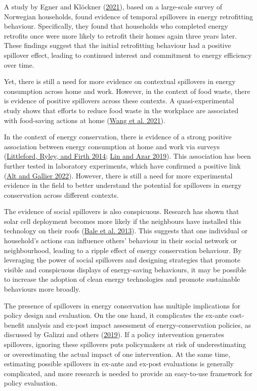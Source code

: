 \documentclass[
  11pt,
  captions=heading]{scrreport}
\begin{document}
A study by Egner and Klöckner
(\protect\hyperlink{ref-egner2021temporal}{2021}), based on a
large-scale survey of Norwegian households, found evidence of temporal
spillovers in energy retrofitting behaviour. Specifically, they found
that households who completed energy retrofits once were more likely to
retrofit their homes again three years later. These findings suggest
that the initial retrofitting behaviour had a positive spillover effect,
leading to continued interest and commitment to energy efficiency over
time.

Yet, there is still a need for more evidence on contextual spillovers in
energy consumption across home and work. However, in the context of food
waste, there is evidence of positive spillovers across these contexts. A
quasi-experimental study shows that efforts to reduce food waste in the
workplace are associated with food-saving actions at home
(\protect\hyperlink{ref-wang2021take}{Wang et al. 2021}).

In the context of energy conservation, there is evidence of a strong
positive association between energy consumption at home and work via
surveys (\protect\hyperlink{ref-littleford2014context}{Littleford,
Ryley, and Firth 2014}; \protect\hyperlink{ref-lin2019mixing}{Lin and
Azar 2019}). This association has been further tested in laboratory
experiments, which have confirmed a positive link
(\protect\hyperlink{ref-alt2022incentives}{Alt and Gallier 2022}).
However, there is still a need for more experimental evidence in the
field to better understand the potential for spillovers in energy
conservation across different contexts.

The evidence of social spillovers is also conspicuous. Research has
shown that solar cell deployment becomes more likely if the neighbours
have installed this technology on their roofs
(\protect\hyperlink{ref-bale2013harnessing}{Bale et al. 2013}). This
suggests that one individual or household's actions can influence
others' behaviour in their social network or neighbourhood, leading to a
ripple effect of energy conservation behaviour. By leveraging the power
of social spillovers and designing strategies that promote visible and
conspicuous displays of energy-saving behaviours, it may be possible to
increase the adoption of clean energy technologies and promote
sustainable behaviours more broadly.

The presence of spillovers in energy conservation has multiple
implications for policy design and evaluation. On the one hand, it
complicates the ex-ante cost-benefit analysis and ex-post impact
assessment of energy-conservation policies, as discussed by Galizzi and
others (\protect\hyperlink{ref-galizzi2019measure}{2019}). If a policy
intervention generates spillovers, ignoring these spillovers puts
policymakers at risk of underestimating or overestimating the actual
impact of one intervention. At the same time, estimating possible
spillovers in ex-ante and ex-post evaluations is generally complicated,
and more research is needed to provide an easy-to-use framework for
policy evaluation.
\end{document}
